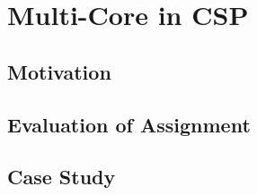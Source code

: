 
\chapter{Multi-Core in CSP}
\label{ch:multicore_csp}

\section{Motivation}

\section{Evaluation of Assignment}

\section{Case Study}
